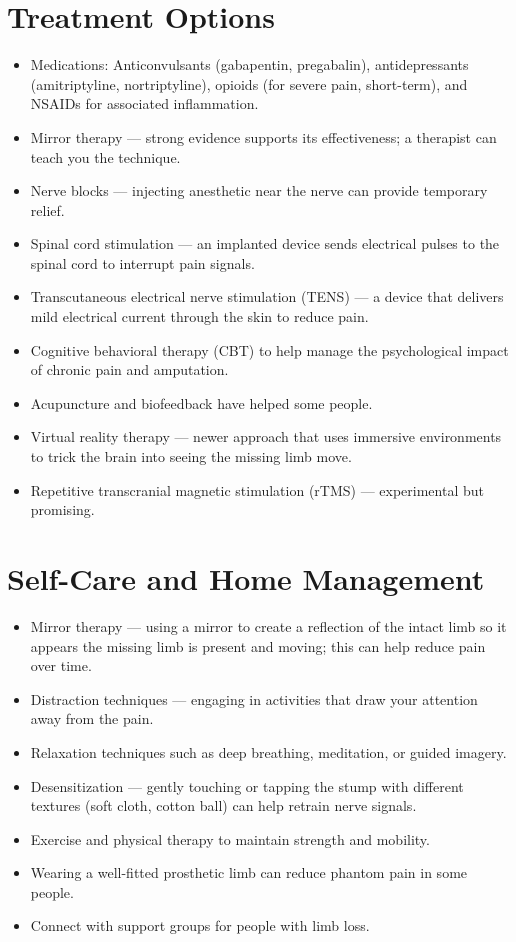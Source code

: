 \section*{Treatment Options}
\begin{itemize}
  \item Medications: Anticonvulsants (gabapentin, pregabalin), antidepressants (amitriptyline, nortriptyline), opioids (for severe pain, short-term), and NSAIDs for associated inflammation.
  \item Mirror therapy — strong evidence supports its effectiveness; a therapist can teach you the technique.
  \item Nerve blocks — injecting anesthetic near the nerve can provide temporary relief.
  \item Spinal cord stimulation — an implanted device sends electrical pulses to the spinal cord to interrupt pain signals.
  \item Transcutaneous electrical nerve stimulation (TENS) — a device that delivers mild electrical current through the skin to reduce pain.
  \item Cognitive behavioral therapy (CBT) to help manage the psychological impact of chronic pain and amputation.
  \item Acupuncture and biofeedback have helped some people.
  \item Virtual reality therapy — newer approach that uses immersive environments to trick the brain into seeing the missing limb move.
  \item Repetitive transcranial magnetic stimulation (rTMS) — experimental but promising.
\end{itemize}

\section*{Self-Care and Home Management}
\begin{itemize}
  \item Mirror therapy — using a mirror to create a reflection of the intact limb so it appears the missing limb is present and moving; this can help reduce pain over time.
  \item Distraction techniques — engaging in activities that draw your attention away from the pain.
  \item Relaxation techniques such as deep breathing, meditation, or guided imagery.
  \item Desensitization — gently touching or tapping the stump with different textures (soft cloth, cotton ball) can help retrain nerve signals.
  \item Exercise and physical therapy to maintain strength and mobility.
  \item Wearing a well-fitted prosthetic limb can reduce phantom pain in some people.
  \item Connect with support groups for people with limb loss.
\end{itemize}

